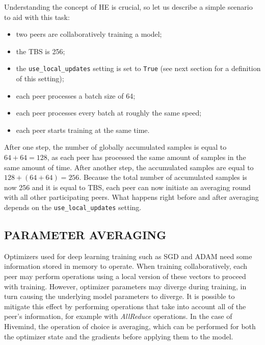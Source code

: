 Understanding the concept of HE is crucial, so let us describe a simple scenario to aid with this task:
\begin{itemize}
    \item two peers are collaboratively training a model;
    \item the TBS is 256;
    \item the \texttt{use\_local\_updates} setting is set to \texttt{True} (see next section for a definition of this setting);
    \item each peer processes a batch size of 64;
    \item each peer processes every batch at roughly the same speed;
    \item each peer starts training at the same time.
\end{itemize}
After one step, the number of globally accumulated samples is equal to $64+64=128$, as each peer has processed the same amount of samples in the same amount of time.
After another step, the accumulated samples are equal to $128+(64+64)=256$.
Because the total number of accumulated samples is now 256 and it is equal to TBS, each peer can now initiate an averaging round with all other participating peers.
What happens right before and after averaging depends on the \texttt{use\_local\_updates} setting.

\subsection{PARAMETER AVERAGING}

Optimizers used for deep learning training such as SGD \cite{10.1214/aoms/1177729392} and ADAM \cite{10.48550/arxiv.1412.6980} need some information stored in memory to operate.
When training collaboratively, each peer may perform operations using a local version of these vectors to proceed with training.
However, optimizer parameters may diverge during training, in turn causing the underlying model parameters to diverge.
It is possible to mitigate this effect by performing operations that take into account all of the peer's information, for example with \textit{AllReduce} operations.
In the case of Hivemind, the operation of choice is averaging, which can be performed for both the optimizer state and the gradients before applying them to the model.


